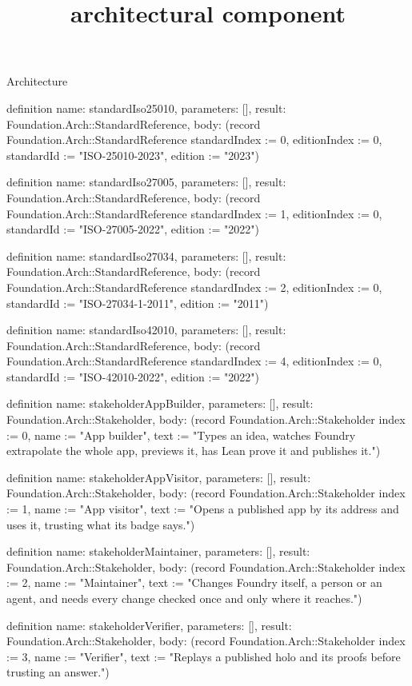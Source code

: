 \begin{lexlean}{Architecture}
\title{architectural component}
\begin{semanticmodule}
definition{
  name: standardIso25010,
  parameters: [],
  result: Foundation.Arch::StandardReference,
  body: (record Foundation.Arch::StandardReference {standardIndex := 0, editionIndex := 0, standardId := "ISO-25010-2023", edition := "2023"})
}

definition{
  name: standardIso27005,
  parameters: [],
  result: Foundation.Arch::StandardReference,
  body: (record Foundation.Arch::StandardReference {standardIndex := 1, editionIndex := 0, standardId := "ISO-27005-2022", edition := "2022"})
}

definition{
  name: standardIso27034,
  parameters: [],
  result: Foundation.Arch::StandardReference,
  body: (record Foundation.Arch::StandardReference {standardIndex := 2, editionIndex := 0, standardId := "ISO-27034-1-2011", edition := "2011"})
}

definition{
  name: standardIso42010,
  parameters: [],
  result: Foundation.Arch::StandardReference,
  body: (record Foundation.Arch::StandardReference {standardIndex := 4, editionIndex := 0, standardId := "ISO-42010-2022", edition := "2022"})
}

definition{
  name: stakeholderAppBuilder,
  parameters: [],
  result: Foundation.Arch::Stakeholder,
  body: (record Foundation.Arch::Stakeholder {index := 0, name := "App builder", text := "Types an idea, watches Foundry extrapolate the whole app, previews it, has Lean prove it and publishes it."})
}

definition{
  name: stakeholderAppVisitor,
  parameters: [],
  result: Foundation.Arch::Stakeholder,
  body: (record Foundation.Arch::Stakeholder {index := 1, name := "App visitor", text := "Opens a published app by its address and uses it, trusting what its badge says."})
}

definition{
  name: stakeholderMaintainer,
  parameters: [],
  result: Foundation.Arch::Stakeholder,
  body: (record Foundation.Arch::Stakeholder {index := 2, name := "Maintainer", text := "Changes Foundry itself, a person or an agent, and needs every change checked once and only where it reaches."})
}

definition{
  name: stakeholderVerifier,
  parameters: [],
  result: Foundation.Arch::Stakeholder,
  body: (record Foundation.Arch::Stakeholder {index := 3, name := "Verifier", text := "Replays a published holo and its proofs before trusting an answer."})
}


\end{semanticmodule}
\end{lexlean}
